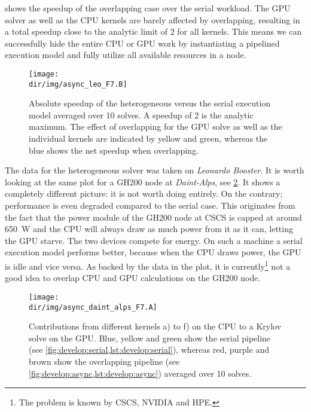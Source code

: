  shows the speedup of the overlapping case over the serial workload.
The GPU solver as well as the CPU kernels are barely affected by overlapping, resulting in a total speedup close to the analytic limit of \num{2} for all kernels.
This means we can successfully hide the entire CPU or GPU work by instantiating a pipelined execution model and fully utilize all available resources in a node.
\begin{figure}
\centering
\texttt{[image: \\dir/img/async\_leo\_F7.B]}
\caption{
Absolute speedup of the heterogeneous versus the serial execution model averaged over \num{10} solves.
A speedup of \num{2} is the analytic maximum.
The effect of overlapping for the GPU solve as well as the individual kernels are indicated by yellow and green, whereas the blue shows the net speedup when overlapping.
 }
\label{fig:async:F7:leo:speedup}
\end{figure}

The data for the heterogeneous solver was taken on \emph{Leonardo Booster}.
It is worth looking at the same plot for a GH200 node at \emph{Daint-Alps}, see \cref{fig:async:F7:daint:bar}.
It shows a completely different picture: it is not worth doing entirely.
On the contrary; performance is even degraded compared to the serial case.
This originates from the fact that the power module of the GH200 node at CSCS is capped at around \SI{650}{\watt} and the CPU will always draw as much power from it as it can, letting the GPU starve.
The two devices compete for energy.
On such a machine a serial execution model performs better, because when the CPU draws power, the GPU is idle and vice versa.
As backed by the data in the plot, it is currently\footnote{The problem is known by CSCS, NVIDIA and HPE.} not a good idea to overlap CPU and GPU calculations on the GH200 node.
\begin{figure}
    \centering
    \texttt{[image: \\dir/img/async\_daint\_alps\_F7.A]}
    \caption{Contributions from different kernels a) to f) on the CPU to a Krylov solve on the GPU. Blue, yellow and green show the serial pipeline (see \cref{fig:develop:serial,lst:develop:serial}), whereas red, purple and brown show the overlapping pipeline (see \cref{fig:develop:async,lst:develop:async}) averaged over \num{10} solves. }
    \label{fig:async:F7:daint:bar}
\end{figure}


